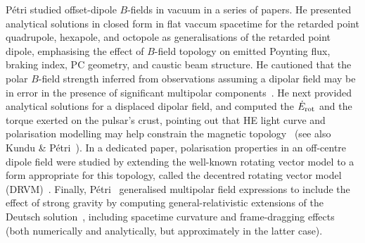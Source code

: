 \documentclass{PoS}
\begin{document}
P\'etri studied offset-dipole $B$-fields in vacuum in a series of papers. He presented analytical solutions in closed form in flat vaccum spacetime for the retarded point quadrupole, hexapole, and octopole as generalisations of the retarded point dipole, emphasising the effect of $B$-field topology on emitted Poynting flux, braking index, PC geometry, and caustic beam structure. He cautioned that the polar $B$-field strength inferred from observations assuming a dipolar field may be in error in the presence of significant multipolar components~\cite{Petri15}. He next provided analytical solutions for a displaced dipolar field, and computed the $\dot{E}_{\rm rot}$ and the torque exerted on the pulsar's crust, pointing out that HE light curve and polarisation modelling may help constrain the magnetic topology~\cite{Petri16} (see also Kundu \& P\'etri~\cite{Kundu17}). In a dedicated paper, polarisation properties in an off-centre dipole field were studied by extending the well-known rotating vector model to a form appropriate for this topology, called the decentred rotating vector model (DRVM)~\cite{Petri17a}. Finally, P\'etri~\cite{Petri17b} generalised multipolar field expressions to include the effect of strong gravity by computing general-relativistic extensions of the Deutsch solution~\cite{Deutsch55}, including spacetime curvature and frame-dragging effects (both numerically and analytically, but approximately in the latter case).
\end{document}
